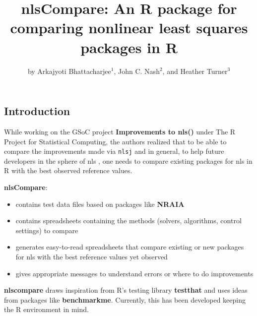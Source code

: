 \title{nlsCompare: An R package for comparing nonlinear least squares
packages in R}
\author{by Arkajyoti Bhattacharjee\(^1\), John C. Nash\(^2\), and Heather
Turner\(^3\)}

\maketitle


\hypertarget{introduction}{%
\subsection{Introduction}\label{introduction}}

While working on the GSoC project \textbf{Improvements to nls()} under
The R Project for Statistical Computing, the authors realized that to be
able to compare the improvements made via \texttt{nlsj} and in general,
to help future developers in the sphere of nls , one needs to compare
existing packages for nls in R with the best observed reference values.

\textbf{nlsCompare}:

\begin{itemize}
\tightlist
\item
  contains test data files based on packages like \textbf{NRAIA}
\item
  contains spreadsheets containing the methods (solvers, algorithms,
  control settings) to compare
\item
  generates easy-to-read spreadsheets that compare existing or new
  packages for nls with the best reference values yet observed
\item
  gives appropriate messages to understand errors or where to do
  improvements
\end{itemize}

\textbf{nlscompare} draws inspiration from R's testing library
\textbf{testthat} and uses ideas from packages like
\textbf{benchmarkme}. Currently, this has been developed keeping the R
environment in mind.

